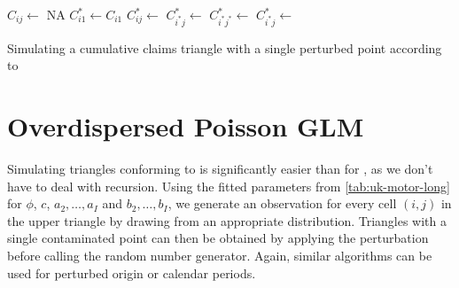 \documentclass[a4paper]{book}
\begin{document}
\begin{algorithm}[!htb]
  \begin{algorithmic}
      \State $C_{ij} \gets$ \textsc{NA}
    \EndFor
      \State $C^*_{i1} \gets C_{i1}$
          \State $C^*_{ij} \gets$ 
        \EndFor
      \Else
          \State $C^*_{i^*j} \gets$ 
        \EndFor
        \State $C^*_{i^*j^*} \gets$ 
          \State $C^*_{i^*j} \gets$ 
        \EndFor
      \EndIf
    \EndFor
    \State {}
  \end{algorithmic}
  \caption{Simulating a cumulative claims triangle with a single perturbed point according to }
  \label{alg:pert-mack-triangle}
\end{algorithm}

\section{Overdispersed Poisson GLM} \label{sec:odp-sim}

Simulating triangles conforming to  is significantly easier than for , as we don't have to deal with recursion. Using the fitted parameters from \cref{tab:uk-motor-long} for $\phi$, $c$, $a_2, \dots, a_I$ and $b_2, \dots, b_I$, we generate an observation for every cell $(i, j)$ in the upper triangle by drawing from an appropriate distribution. Triangles with a single contaminated point can then be obtained by applying the perturbation before calling the random number generator. Again, similar algorithms can be used for perturbed origin or calendar periods.
\end{document}
